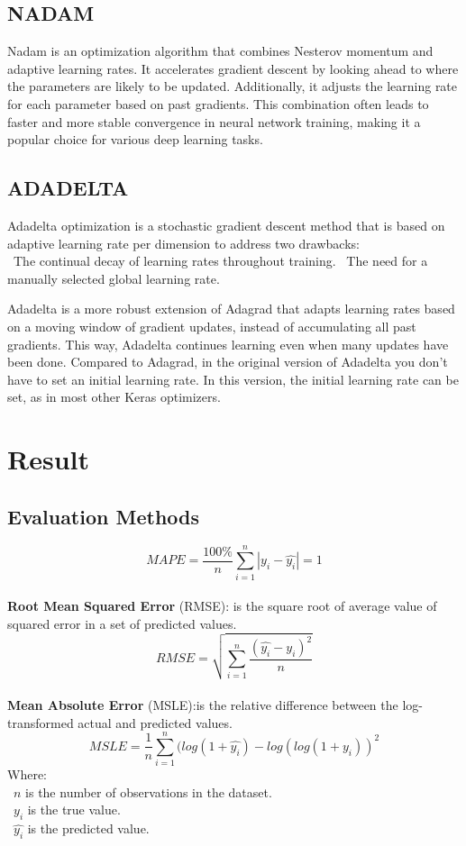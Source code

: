\documentclass{ieeeojies}
\begin{document}
\subsection{NADAM} 
Nadam is an optimization algorithm that combines Nesterov momentum and adaptive learning rates. It accelerates gradient descent by looking ahead to where the parameters are likely to be updated. Additionally, it adjusts the learning rate for each parameter based on past gradients. This combination often leads to faster and more stable convergence in neural network training, making it a popular choice for various deep learning tasks.
\subsection{ADADELTA} 
Adadelta optimization is a stochastic gradient descent method that is based on adaptive learning rate per dimension to address two drawbacks:\\
\indent\textbullet\ The continual decay of learning rates throughout training.
\indent\textbullet\ The need for a manually selected global learning rate.

Adadelta is a more robust extension of Adagrad that adapts learning rates based on a moving window of gradient updates, instead of accumulating all past gradients. This way, Adadelta continues learning even when many updates have been done. Compared to Adagrad, in the original version of Adadelta you don't have to set an initial learning rate. In this version, the initial learning rate can be set, as in most other Keras optimizers.



\section{Result}

\subsection{Evaluation Methods}
\[MAPE=\frac{100\%}{n}  \sum_{i=1}^{n} |y_i-\hat{y_i} |  = 1 \]\\
\textbf{Root Mean Squared Error} (RMSE): is the square root of average value of squared error in a set of predicted values.\\
\[RMSE=\sqrt{\sum_{i=1}^{n} \frac{(\hat{y_i}-y_i )^2}{n} }\]\\
\textbf{Mean Absolute Error} (MSLE):is the relative difference between the log-transformed actual and predicted values.\\
\[MSLE=\frac{1}{n}\sum_{i=1}^{n}(log(1+\hat{y_i})-log(log(1+y_i))^2\]
Where: \\
	\indent\textbullet\ \(n\) is the number of observations in the dataset.\\
	\indent\textbullet\ \(y_i\)  is the true value.\\
	\indent\textbullet\ \(\hat{y_i}\) is the predicted value.
\end{document}
